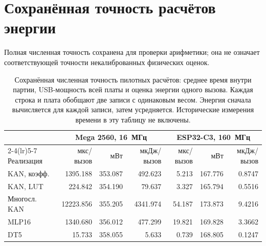 \section{Сохранённая точность расчётов энергии}
Полная численная точность сохранена для проверки арифметики; она не означает соответствующей точности некалиброванных физических оценок.
\begin{table}[!htbp]
\centering\footnotesize\setlength{\tabcolsep}{4pt}
\caption{Сохранённая численная точность пилотных расчётов: среднее время внутри партии, USB-мощность всей платы и оценка энергии одного вызова. Каждая строка и плата обобщают две записи с одинаковым весом. Энергия сначала вычисляется для каждой записи, затем усредняется. Исторические измерения времени в эту таблицу не включены.}
\label{tab:energy-full-precision}
\begin{tabular}{lrrrrrr}
\toprule
& \multicolumn{3}{c}{Mega 2560, 16~МГц} & \multicolumn{3}{c}{ESP32-C3, 160~МГц}\\
\cmidrule(lr){2-4}\cmidrule(lr){5-7}
Реализация & мкс/вызов & мВт & мкДж/вызов & мкс/вызов & мВт & мкДж/вызов\\
\midrule
KAN, коэфф. & 1395.188 & 353.087 & 492.623 & 5.213 & 167.776 & 0.8747\\
KAN, LUT & 224.842 & 354.190 & 79.637 & 3.327 & 165.794 & 0.5516\\
Многосл. KAN & 12223.856 & 355.205 & 4341.974 & 54.187 & 173.873 & 9.4216\\
MLP16 & 1340.680 & 356.012 & 477.299 & 19.821 & 169.828 & 3.3662\\
DT5 & 15.733 & 358.055 & 5.633 & 0.739 & 168.805 & 0.1247\\
\bottomrule
\end{tabular}
\end{table}
